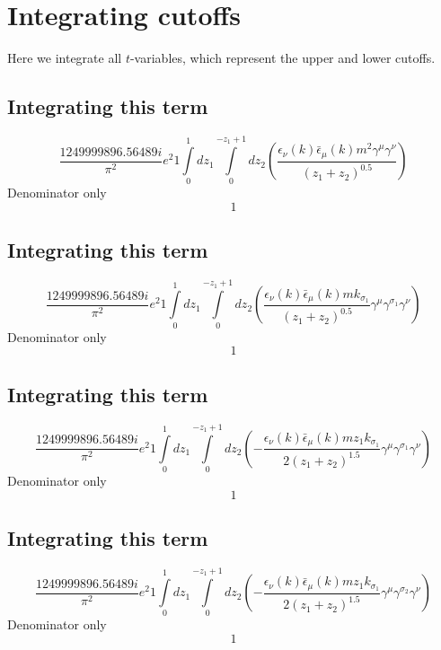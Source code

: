 \section*{Integrating cutoffs}
Here we integrate all $t$-variables, which represent the upper and lower cutoffs.
\subsection*{Integrating this term}
\begin{dmath}\frac{1249999896.56489 i}{\pi^{2}} e^{2}1\int\limits_{ 0 }^{ 1 } d{ z_{ 1 } }\int\limits_{ 0 }^{ - { z_{ 1 } } + 1 } d{ z_{ 2 } }\left(\frac{\epsilon_{ \nu }({ k }) \bar{\epsilon}_{ \mu }({ k }) m^{2} { \gamma^{ \mu } } { \gamma^{ \nu } }}{\left({ z_{ 1 } } + { z_{ 2 } }\right)^{0.5}}\right)\end{dmath}
Denominator only
\begin{dmath}1\end{dmath}
\subsection*{Integrating this term}
\begin{dmath}\frac{1249999896.56489 i}{\pi^{2}} e^{2}1\int\limits_{ 0 }^{ 1 } d{ z_{ 1 } }\int\limits_{ 0 }^{ - { z_{ 1 } } + 1 } d{ z_{ 2 } }\left(\frac{\epsilon_{ \nu }({ k }) \bar{\epsilon}_{ \mu }({ k }) m { { k }_{ \sigma_1 } }}{\left({ z_{ 1 } } + { z_{ 2 } }\right)^{0.5}} { \gamma^{ \mu } } { \gamma^{ \sigma_1 } } { \gamma^{ \nu } }\right)\end{dmath}
Denominator only
\begin{dmath}1\end{dmath}
\subsection*{Integrating this term}
\begin{dmath}\frac{1249999896.56489 i}{\pi^{2}} e^{2}1\int\limits_{ 0 }^{ 1 } d{ z_{ 1 } }\int\limits_{ 0 }^{ - { z_{ 1 } } + 1 } d{ z_{ 2 } }\left(- \frac{\epsilon_{ \nu }({ k }) \bar{\epsilon}_{ \mu }({ k }) m { z_{ 1 } } { { k }_{ \sigma_1 } }}{2 \left({ z_{ 1 } } + { z_{ 2 } }\right)^{1.5}} { \gamma^{ \mu } } { \gamma^{ \sigma_1 } } { \gamma^{ \nu } }\right)\end{dmath}
Denominator only
\begin{dmath}1\end{dmath}
\subsection*{Integrating this term}
\begin{dmath}\frac{1249999896.56489 i}{\pi^{2}} e^{2}1\int\limits_{ 0 }^{ 1 } d{ z_{ 1 } }\int\limits_{ 0 }^{ - { z_{ 1 } } + 1 } d{ z_{ 2 } }\left(- \frac{\epsilon_{ \nu }({ k }) \bar{\epsilon}_{ \mu }({ k }) m { z_{ 1 } } { { k }_{ \sigma_1 } }}{2 \left({ z_{ 1 } } + { z_{ 2 } }\right)^{1.5}} { \gamma^{ \mu } } { \gamma^{ \sigma_2 } } { \gamma^{ \nu } }\right)\end{dmath}
Denominator only
\begin{dmath}1\end{dmath}
